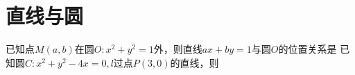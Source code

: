 \section{直线与圆}
\begin{questions}
\qs 已知点$ M(a,b) $在圆$ O:x^2+y^2=1 $外，则直线$ ax+by=1 $与圆$ O $的位置关系是\xx
{} 
\qs 已知圆$ C:x^2+y^2-4x=0 ,l$过点$ P(3,0) $的直线，则\xx
{}
\end{questions}